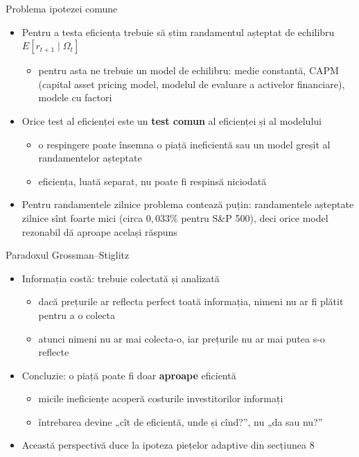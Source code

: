 \begin{frame}{Problema ipotezei comune}
\itemsize{\small}
\begin{itemize}
    \item Pentru a testa eficiența trebuie să știm randamentul așteptat de echilibru $E[r_{t+1} \mid \Omega_t]$
    \begin{itemize}
        \item pentru asta ne trebuie un model de echilibru: medie constantă, CAPM (capital asset pricing model, modelul de evaluare a activelor financiare), modele cu factori
    \end{itemize}
    \item Orice test al eficienței este un \textbf{test comun} al eficienței și al modelului 
    \begin{itemize}
        \item o respingere poate însemna o piață ineficientă sau un model greșit al randamentelor așteptate
        \item eficiența, luată separat, nu poate fi respinsă niciodată
    \end{itemize}
    \item Pentru randamentele zilnice problema contează puțin: randamentele așteptate zilnice sînt foarte mici (circa $0{,}033\%$ pentru S\&P 500), deci orice model rezonabil dă aproape același răspuns
\end{itemize}
\end{frame}

\begin{frame}{Paradoxul Grossman--Stiglitz}
\itemsize{\small}
\begin{itemize}
    \item Informația costă: trebuie colectată și analizată 
    \begin{itemize}
        \item dacă prețurile ar reflecta perfect toată informația, nimeni nu ar fi plătit pentru a o colecta
        \item atunci nimeni nu ar mai colecta-o, iar prețurile nu ar mai putea s-o reflecte
    \end{itemize}
    \item Concluzie: o piață poate fi doar \textbf{aproape} eficientă
    \begin{itemize}
        \item micile ineficiențe acoperă costurile investitorilor informați
        \item întrebarea devine „cît de eficientă, unde și cînd?”, nu „da sau nu?”
    \end{itemize}
    \item Această perspectivă duce la ipoteza piețelor adaptive din secțiunea 8
\end{itemize}
\end{frame}

